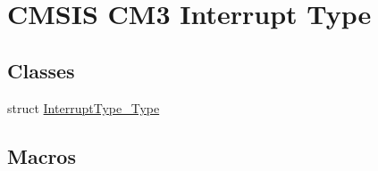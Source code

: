 \hypertarget{group___c_m_s_i_s___c_m3___interrupt_type}{\section{C\-M\-S\-I\-S C\-M3 Interrupt Type}
\label{group___c_m_s_i_s___c_m3___interrupt_type}
}
\subsection*{Classes}
\begin{DoxyCompactItemize}
\item 
struct \hyperlink{struct_interrupt_type___type}{Interrupt\-Type\-\_\-\-Type}
\end{DoxyCompactItemize}
\subsection*{Macros}
